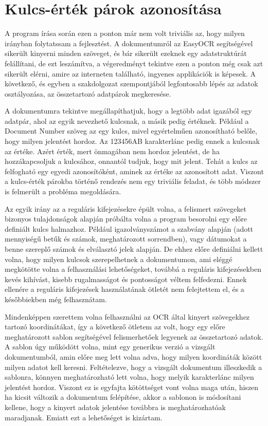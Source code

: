 \documentclass[12pt]{report}
\begin{document}
\section{Kulcs-érték párok azonosítása}

A program írása során ezen a ponton már nem volt triviális az, hogy milyen irányban folytatssam a fejlesztést. A dokumentumról az EasyOCR segítségével sikerült kinyerni minden szöveget, és bár sikerült ezeknek egy adatstruktúrát felállítani, de ezt leszámítva, a végeredményt tekintve ezen a ponton még csak azt sikerült elérni, amire az interneten található, ingyenes applikációk is képesek. A következő, és egyben a szakdolgozat szempontjából legfontosabb lépés az adatok osztályozása, az összetartozó adatpárok megkeresése.

A dokumentumra tekintve megállapíthatjuk, hogy a legtöbb adat igazából egy adatpár, ahol az egyik nevezhető kulcsnak, a másik pedig értéknek. Például a Document Number szöveg az egy kulcs, mivel egyértelműen azonosítható belőle, hogy milyen jelentést hordoz. Az 123456AB karakterlánc pedig ennek a kulcsnak az értéke. Azért érték, mert önmagában nem hordoz jelentést, de ha hozzákapcsoljuk a kulcsához, onnantól tudjuk, hogy mit jelent. Tehát a kulcs az felfogható egy egyedi azonosítóként, aminek az értéke az azonosított adat. Viszont a kulcs-érték párokba történő rendezés nem egy triviális feladat, és több módszer is felmerült a probléma megoldására.

Az egyik irány az a reguláris kifejezésekre épült volna, a felismert szövegeket bizonyos tulajdonságok alapján próbálta volna a program besorolni egy előre definiált kulcs halmazhoz. Például igazolványszámot a szabvány alapján (adott mennyiségű betűk és számok, meghatározott sorrendben), vagy dátumokat a benne szereplő számok és elválasztó jelek alapján. De ehhez előre definiálni kellett volna, hogy milyen kulcsok szerepelhetnek a dokumentumon, ami eléggé megkötötte volna a felhasználási lehetőségeket, továbbá a reguláris kifejezésekben kevés kihívást, kisebb rugalmasságot és pontosságot véltem felfedezni. Ennek ellenére a reguláris kifejezések használatának ötletét nem felejtettem el, és a későbbiekben még felhasznátam.

Mindenképpen szerettem volna felhasználni az OCR által kinyert szövegekhez tartozó koordinátákat, így a következő ötletem az volt, hogy egy előre meghatározott sablon segítségével felismerhetőek legyenek az összetartozó adatok. A sablon úgy működött volna, mint egy generikus verzió a vizsgált dokumentumból, amin előre meg lett volna adva, hogy milyen koordináták között milyen adatot kell keresni. Feltételezve, hogy a vizsgált dokumentum illeszkedik a sablonra, könnyen meghatározható lett volna, hogy melyik karakterlánc milyen jelentést hordoz. Viszont ez is egyfajta kötöttséget vont volna maga után, hiszen ha kicsit változik a dokumentum felépítése, akkor a sablonon is módosítani kellene, hogy a kinyert adatok jelentése továbbra is meghatározhatóak maradjanak. Emiatt ezt a lehetőséget is kizártam.
\end{document}
